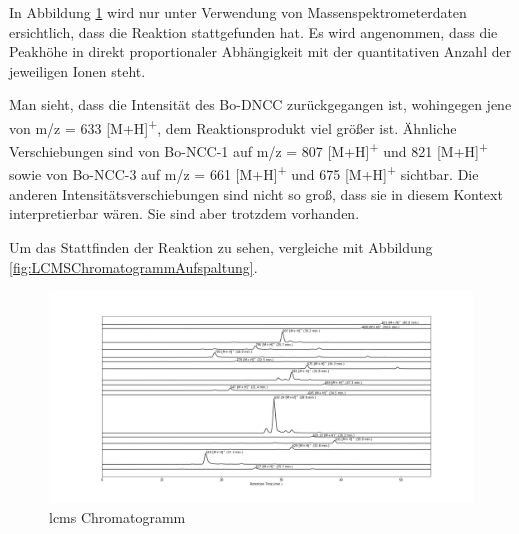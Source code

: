 In Abbildung \ref{fig:LCMSChromatogrammRPAufspaltung} wird nur unter Verwendung von Massenspektrometerdaten ersichtlich, dass die Reaktion stattgefunden hat. Es wird angenommen, dass die Peakhöhe in direkt proportionaler Abhängigkeit mit der quantitativen Anzahl der jeweiligen Ionen steht.

Man sieht, dass die Intensität des Bo-DNCC zurückgegangen ist, wohingegen jene von m/z = 633 [M+H]\textsuperscript{+}, dem Reaktionsprodukt viel größer ist. Ähnliche Verschiebungen sind von Bo-NCC-1 auf m/z = 807 [M+H]\textsuperscript{+} und 821 [M+H]\textsuperscript{+} sowie von Bo-NCC-3 auf m/z = 661 [M+H]\textsuperscript{+} und 675 [M+H]\textsuperscript{+} sichtbar. Die anderen Intensitätsverschiebungen sind nicht so groß, dass sie in diesem Kontext interpretierbar wären. Sie sind aber trotzdem vorhanden.

Um das Stattfinden der Reaktion zu sehen, vergleiche mit Abbildung \ref{fig:LCMSChromatogrammAufspaltung}.

\begin{figure}[!htbp]
  \centering
  \includegraphics[width=1.4\textwidth, center]{figures/Kapitel6/Reaktion3h/Kuerbis_Analyse_Reaktion3h_LC-ESI-MS.png}
  \caption[LC-MS Chromatogramm nach 3h Reaktionsdauer - Aufspaltung, Quelle: Autor]{\gls{lcms} Chromatogramm}
  \label{fig:LCMSChromatogrammRPAufspaltung}
\end{figure}

